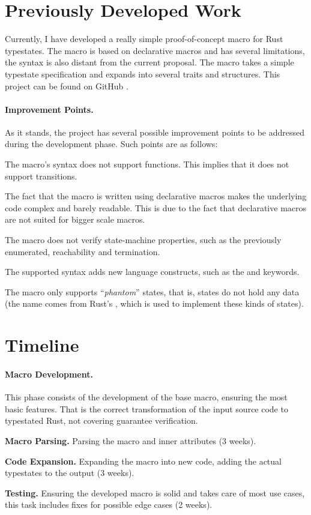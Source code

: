 \section{Previously Developed Work}

Currently, I have developed a really simple proof-of-concept macro for Rust typestates.
The macro is based on declarative macros and has several limitations,
the syntax is also distant from the current proposal.
The macro takes a simple typestate specification and expands into several traits and structures.
This project can be found on GitHub \autocite{Duarte2020a}.

\paragraph{Improvement Points.}
As it stands, the project has several possible improvement points to be addressed during the development phase.
Such points are as follows:
\begin{compactitem}
    \item The macro's syntax does not support functions. This implies that it does not support transitions.
    \item The fact that the macro is written using declarative macros makes the underlying code complex and barely readable.
    This is due to the fact that declarative macros are not suited for bigger scale macros.
    \item The macro does not verify state-machine properties, such as the previously enumerated, reachability and termination.
    \item The supported syntax adds new language constructs, such as the  and  keywords.
    \item The macro only supports “\emph{phantom}” states, that is, states do not hold any data
    (the name comes from Rust's , which is used to implement these kinds of states).
\end{compactitem}

\section{Timeline}

\paragraph{Macro Development.}
This phase consists of the development of the base macro, ensuring the most basic features.
That is the correct transformation of the input source code to typestated Rust, not covering guarantee verification.
\begin{compactitem}
    \item \textbf{Macro Parsing.} Parsing the macro and inner attributes (3 weeks).
    \item \textbf{Code Expansion.} Expanding the macro into new code, adding the actual typestates to the output (3 weeks).
    \item \textbf{Testing.} Ensuring the developed macro is solid and takes care of most use cases, this task includes fixes for possible edge cases (2 weeks).
\end{compactitem}

